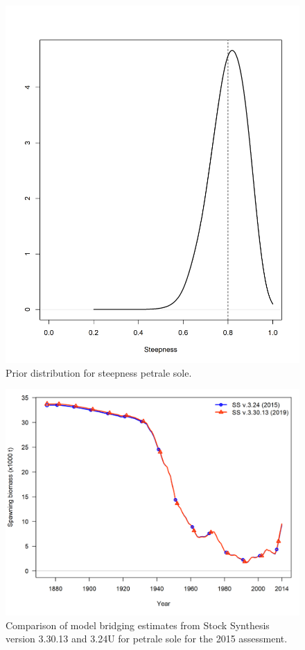 \documentclass[12pt,]{article}
\begin{document}
\begin{figure}
\centering
\includegraphics{Figures/h_prior.png}
\caption{Prior distribution for steepness petrale sole.
\label{fig:h_prior}}
\end{figure}

\FloatBarrier

\begin{figure}
\centering
\includegraphics{Figures/compare1_spawnbio.png}
\caption{Comparison of model bridging estimates from Stock Synthesis
version 3.30.13 and 3.24U for petrale sole for the 2015 assessment.
\label{fig:bridge}}
\end{figure}
\end{document}

